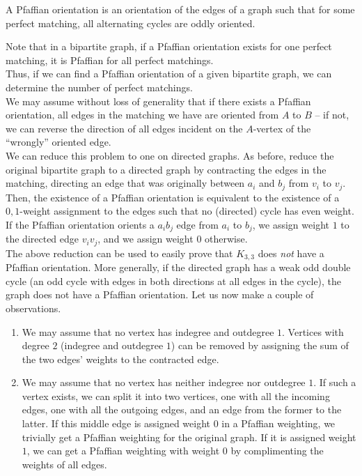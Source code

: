 \begin{fdef}
	A Pfaffian orientation is an orientation of the edges of a graph such that for some perfect matching, all alternating cycles are oddly oriented. 
\end{fdef}
Note that in a bipartite graph, if a Pfaffian orientation exists for one perfect matching, it is Pfaffian for all perfect matchings.\\

Thus, if we can find a Pfaffian orientation of a given bipartite graph, we can determine the number of perfect matchings.\\
We may assume without loss of generality that if there exists a Pfaffian orientation, all edges in the matching we have are oriented from $A$ to $B$ -- if not, we can reverse the direction of all edges incident on the $A$-vertex of the ``wrongly'' oriented edge.\\
We can reduce this problem to one on directed graphs. As before, reduce the original bipartite graph to a directed graph by contracting the edges in the matching, directing an edge that was originally between $a_i$ and $b_j$ from $v_i$ to $v_j$. Then, the existence of a Pfaffian orientation is equivalent to the existence of a $0,1$-weight assignment to the edges such that no (directed) cycle has even weight. If the Pfaffian orientation orients a $a_ib_j$ edge from $a_i$ to $b_j$, we assign weight $1$ to the directed edge $v_iv_j$, and we assign weight $0$ otherwise.\\
The above reduction can be used to easily prove that $K_{3,3}$ does \emph{not} have a Pfaffian orientation. More generally, if the directed graph has a weak odd double cycle (an odd cycle with edges in both directions at all edges in the cycle), the graph does not have a Pfaffian orientation. Let us now make a couple of observations.
\begin{enumerate}
	\item We may assume that no vertex has indegree and outdegree $1$. Vertices with degree $2$ (indegree and outdegree $1$) can be removed by assigning the sum of the two edges' weights to the contracted edge.
	\item We may assume that no vertex has neither indegree nor outdegree $1$. If such a vertex exists, we can split it into two vertices, one with all the incoming edges, one with all the outgoing edges, and an edge from the former to the latter. If this middle edge is assigned weight $0$ in a Pfaffian weighting, we trivially get a Pfaffian weighting for the original graph. If it is assigned weight $1$, we can get a Pfaffian weighting with weight $0$ by complimenting the weights of all edges.
\end{enumerate}

